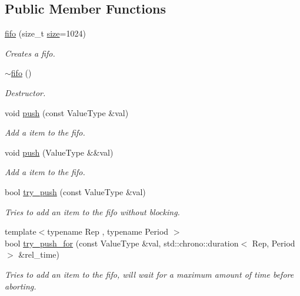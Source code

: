 \subsection*{Public Member Functions}
\begin{DoxyCompactItemize}
\item 
\hyperlink{classcpen333_1_1thread_1_1fifo_a472cd6f1727d27179fc6c2b1067145fb}{fifo} (size\+\_\+t \hyperlink{classcpen333_1_1thread_1_1fifo_a9cb822d2b108ebf092146dbe2cd90f1f}{size}=1024)
\begin{DoxyCompactList}\small\item\em Creates a fifo. \end{DoxyCompactList}\item 
\hyperlink{classcpen333_1_1thread_1_1fifo_a2a0c73dacfbb260c31558d81a92d1728}{$\sim$fifo} ()
\begin{DoxyCompactList}\small\item\em Destructor. \end{DoxyCompactList}\item 
void \hyperlink{classcpen333_1_1thread_1_1fifo_a9b2288b7fd27065b58060e225601e550}{push} (const Value\+Type \&val)
\begin{DoxyCompactList}\small\item\em Add a item to the fifo. \end{DoxyCompactList}\item 
void \hyperlink{classcpen333_1_1thread_1_1fifo_a055c1d083c7e8b9b60d4b503780357ff}{push} (Value\+Type \&\&val)
\begin{DoxyCompactList}\small\item\em Add a item to the fifo. \end{DoxyCompactList}\item 
bool \hyperlink{classcpen333_1_1thread_1_1fifo_a52254b9ca6086b9e56a07bf6e4a84a4f}{try\+\_\+push} (const Value\+Type \&val)
\begin{DoxyCompactList}\small\item\em Tries to add an item to the fifo without blocking. \end{DoxyCompactList}\item 
{\footnotesize template$<$typename Rep , typename Period $>$ }\\bool \hyperlink{classcpen333_1_1thread_1_1fifo_a2142a9e6fbedd8b5fc350f1f3fe0542b}{try\+\_\+push\+\_\+for} (const Value\+Type \&val, std\+::chrono\+::duration$<$ Rep, Period $>$ \&rel\+\_\+time)
\begin{DoxyCompactList}\small\item\em Tries to add an item to the fifo, will wait for a maximum amount of time before aborting. \end{DoxyCompactList}\item 

\end{DoxyCompactItemize}
